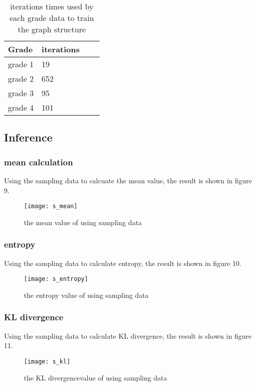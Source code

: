 \documentclass{article}
\begin{document}
\begin{table}[h]
\begin{center}
		\begin{tabular}{ | l | l | l | p{5cm} |}
				\hline
				Grade 		 	& iterations   \\ \hline
				grade 1 		& 19      \\ \hline
				grade 2 		& 652     \\ \hline
				grade 3 		& 95     \\ \hline
				grade 4 		& 101   \\
				\hline
		\end{tabular}
\end{center}
\caption{iterations times used by each grade data to train the graph structure}
\end{table}

\subsection{Inference}
\subsubsection{mean calculation}
Using the sampling data to calcuate the mean value, the 
result is shown in figure 9.
\begin{figure}[h]
		\begin{center}
				\centerline{\texttt{[image: s\_mean]}}
				\caption{the mean value of using sampling data}
		\end{center}
\end{figure}
\subsubsection{entropy}
Using the sampling data to calculate entropy, the result
is shown in figure 10.
\begin{figure}[h]
		\vskip 0.1in
		\begin{center}
				\centerline{\texttt{[image: s\_entropy]}}
				\caption{the entropy value of using sampling data}
		\end{center}
		\vskip -0.1in
\end{figure}

\subsubsection{KL divergence}
Using the sampling data to calculate KL divergence, the result
is shown in figure 11.
\begin{figure}[h]
		\vskip 0.1in
		\begin{center}
				\centerline{\texttt{[image: s\_kl]}}
				\caption{the KL divergencevalue of using sampling data}
		\end{center}
		\vskip -0.1in
\end{figure}
\end{document}
